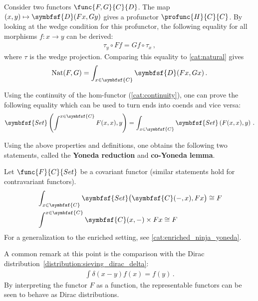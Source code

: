     \begin{example}
        Consider two functors $\func{F,G}{C}{D}$. The map $(x,y)\mapsto\symbfsf{D}(Fx,Gy)$ gives a profunctor $\profunc{H}{C}{C}$. By looking at the wedge condition for this profunctor, the following equality for all morphisms $f:x\rightarrow y$ can be derived:
        \begin{gather}
            \tau_y\circ Ff = Gf\circ\tau_x\,,
        \end{gather}
        where $\tau$ is the wedge projection. Comparing this equality to \cref{cat:natural} gives
        \begin{gather}
            \label{cat:natural_end}
            \mathrm{Nat}(F,G) = \int_{x\in\symbfsf{C}}\symbfsf{D}(Fx,Gx)\,.
        \end{gather}
    \end{example}

    \begin{property}
        Using the continuity of the hom-functor (\cref{cat:continuity}), one can prove the following equality which can be used to turn ends into coends and vice versa:
        \begin{gather}
            \symbfsf{Set}\left(\int^{x\in\symbfsf{C}}F(x,x),y\right) = \int_{x\in\symbfsf{C}}\symbfsf{Set}\left(F(x,x),y\right)\,.
        \end{gather}
    \end{property}

    Using the above properties and definitions, one obtains the following two statements, called the \textbf{Yoneda reduction} and \textbf{co-Yoneda lemma}.
    \begin{property}\label{cat:ninja_yoneda}
        Let $\func{F}{C}{Set}$ be a covariant functor (similar statements hold for contravariant functors).
        \begin{align}
            &\int_{x\in\symbfsf{C}}\symbfsf{Set}\bigl(\symbfsf{C}(-,x),Fx\bigr)\cong F\\
            &\int^{x\in\symbfsf{C}}\symbfsf{C}(x,-)\times Fx\cong F
        \end{align}
        For a generalization to the enriched setting, see \cref{cat:enriched_ninja_yoneda}.
    \end{property}
    \begin{remark}
        A common remark at this point is the comparison with the Dirac distribution~\eqref{distribution:sieving_dirac_delta}:
        \begin{gather}
            \int \delta(x-y)f(x) = f(y)\,.
        \end{gather}
        By interpreting the functor $F$ as a function, the representable functors can be seen to behave as Dirac distributions.
    \end{remark}

